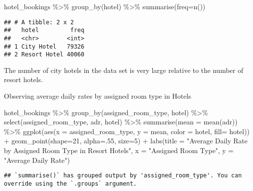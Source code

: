 \documentclass[
]{article}
\newenvironment{Shaded}{\begin{snugshade}}{\end{snugshade}}
\newcommand{\AttributeTok}[1]{\textcolor[rgb]{0.77,0.63,0.00}{#1}}
\newcommand{\DecValTok}[1]{\textcolor[rgb]{0.00,0.00,0.81}{#1}}
\newcommand{\FunctionTok}[1]{\textcolor[rgb]{0.00,0.00,0.00}{#1}}
\newcommand{\NormalTok}[1]{#1}
\newcommand{\SpecialCharTok}[1]{\textcolor[rgb]{0.00,0.00,0.00}{#1}}
\newcommand{\StringTok}[1]{\textcolor[rgb]{0.31,0.60,0.02}{#1}}
\begin{document}
\begin{Shaded}
\begin{Highlighting}[]
\NormalTok{hotel\_bookings }\SpecialCharTok{\%\textgreater{}\%}
  \FunctionTok{group\_by}\NormalTok{(hotel) }\SpecialCharTok{\%\textgreater{}\%} \FunctionTok{summarise}\NormalTok{(}\AttributeTok{freq=}\FunctionTok{n}\NormalTok{())}
\end{Highlighting}
\end{Shaded}

\begin{verbatim}
## # A tibble: 2 x 2
##   hotel         freq
##   <chr>        <int>
## 1 City Hotel   79326
## 2 Resort Hotel 40060
\end{verbatim}

The number of city hotels in the data set is very large relative to the
number of resort hotels.

Observing average daily rates by assigned room type in Hotels

\begin{Shaded}
\begin{Highlighting}[]
\NormalTok{hotel\_bookings }\SpecialCharTok{\%\textgreater{}\%} \FunctionTok{group\_by}\NormalTok{(assigned\_room\_type, hotel) }\SpecialCharTok{\%\textgreater{}\%} \FunctionTok{select}\NormalTok{(assigned\_room\_type, adr, hotel) }\SpecialCharTok{\%\textgreater{}\%} \FunctionTok{summarise}\NormalTok{(}\AttributeTok{mean =} \FunctionTok{mean}\NormalTok{(adr))  }\SpecialCharTok{\%\textgreater{}\%} \FunctionTok{ggplot}\NormalTok{(}\FunctionTok{aes}\NormalTok{(}\AttributeTok{x =}\NormalTok{ assigned\_room\_type, }\AttributeTok{y =}\NormalTok{ mean, }\AttributeTok{color =}\NormalTok{ hotel, }\AttributeTok{fill=}\NormalTok{ hotel)) }\SpecialCharTok{+} \FunctionTok{geom\_point}\NormalTok{(}\AttributeTok{shape=}\DecValTok{21}\NormalTok{, }\AttributeTok{alpha=}\NormalTok{.}\DecValTok{55}\NormalTok{, }\AttributeTok{size=}\DecValTok{5}\NormalTok{) }\SpecialCharTok{+} \FunctionTok{labs}\NormalTok{(}\AttributeTok{title =} \StringTok{"Average Daily Rate by Assigned Room Type in Resort Hotels"}\NormalTok{, }\AttributeTok{x =} \StringTok{"Assigned Room Type"}\NormalTok{, }\AttributeTok{y =} \StringTok{"Average Daily Rate"}\NormalTok{)}
\end{Highlighting}
\end{Shaded}

\begin{verbatim}
## `summarise()` has grouped output by 'assigned_room_type'. You can override using the `.groups` argument.
\end{verbatim}
\end{document}
